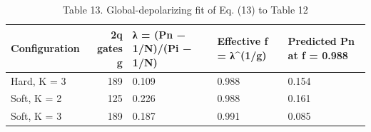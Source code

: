 \begin{table}
\caption{Table 13. Global-depolarizing fit of Eq. (13) to Table 12}
\label{tab:table13}
\begin{tabular}{lrlll}
\toprule
Configuration & 2q gates g & λ = (Pn − 1/N)/(Pi − 1/N) & Effective f = λ\textasciicircum (1/g) & Predicted Pn at f = 0.988 \\
\midrule
Hard, K = 3 & 189 & 0.109 & 0.988 & 0.154 \\
Soft, K = 2 & 125 & 0.226 & 0.988 & 0.161 \\
Soft, K = 3 & 189 & 0.187 & 0.991 & 0.085 \\
\bottomrule
\end{tabular}
\end{table}
